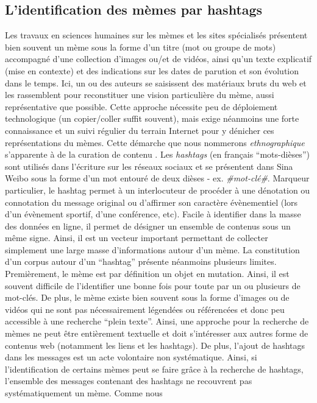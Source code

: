 \subsection[ L{\textquoteright}identification des mèmes par hashtags ]{L{\textquoteright}identification des mèmes par hashtags }

Les travaux en sciences humaines sur les mèmes \citep{Bauckhage2011, Coscia2013, Knobel2007} et les sites spécialisés \citep{Buchel2012, Bernstein2011} présentent bien souvent un mème sous la forme d{\textquoteright}un titre (mot ou groupe de mots) accompagné d{\textquoteright}une collection d{\textquoteright}images ou/et de vidéos, ainsi qu{\textquoteright}un texte explicatif (mise en contexte) et des indications sur les dates de parution et son évolution dans le temps. Ici, un ou des auteurs se saisissent des matériaux bruts du web et les rassemblent pour reconstituer une vision particulière du mème, aussi représentative que possible. Cette approche nécessite peu de déploiement technologique (un copier/coller suffit souvent), mais exige néanmoins une forte connaissance et un suivi régulier du terrain Internet pour y dénicher ces représentations du mèmes. Cette démarche que nous nommerons \textit{ethnographique }s{\textquoteright}apparente à de la curation de contenu \citep{Buckingham2006}. Les \textit{hashtags }(en fran\c{c}ais {\textquotedblleft}mots-dièses{\textquotedblright}) sont utilisés dans l{\textquoteright}écriture sur les réseaux sociaux et se présentent dans Sina Weibo sous la forme d{\textquoteright}un mot entouré de deux dièses - ex. \textit{\#mot-clé\#}. Marqueur particulier, le hashtag permet à un interlocuteur de procéder à une dénotation ou connotation du message original \citep{Romero2011} ou d{\textquoteright}affirmer son caractère évènementiel (lors d{\textquoteright}un évènement sportif, d{\textquoteright}une conférence, etc). Facile à identifier dans la masse des données en ligne, il permet de désigner un ensemble de contenus sous un m\^eme signe. Ainsi, il est un vecteur important permettant de collecter simplement une large masse d{\textquoteright}informations autour d{\textquoteright}un mème. La constitution d{\textquoteright}un corpus autour d{\textquoteright}un {\textquotedblleft}hashtag{\textquotedblright} présente néanmoins plusieurs limites. Premièrement, le mème est par définition un objet en mutation. Ainsi, il est souvent difficile de l{\textquoteright}identifier une bonne fois pour toute par un ou plusieurs de mot-clés. De plus, le mème existe bien souvent sous la forme d{\textquoteright}images ou de vidéos qui ne sont pas nécessairement légendées ou référencées et donc peu accessible à une recherche {\textquotedblleft}plein texte{\textquotedblright}. Ainsi, une approche pour la recherche de mèmes ne peut \^etre entièrement textuelle et doit s{\textquoteright}intéresser aux autres forme de contenus web (notamment les liens et les hashtags). De plus, l{\textquoteright}ajout de hashtags dans les messages est un acte volontaire non systématique. Ainsi, si l{\textquoteright}identification de certains mèmes peut se faire gr\^ace à la recherche de hashtags, l{\textquoteright}ensemble des messages contenant des hashtags ne recouvrent pas systématiquement un mème. Comme nous 